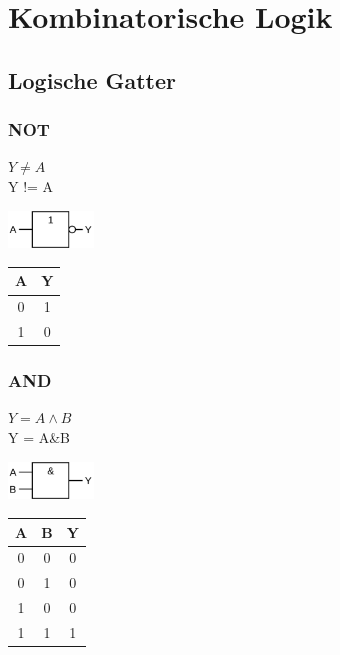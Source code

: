 \section{Kombinatorische Logik}

\subsection{Logische Gatter}

\subsubsection{NOT} 
\begin{center}
    \begin{minipage}{0.55\linewidth}
		$Y \neq A$ \\
		Y != A
        \begin{center}
		\includegraphics[height = 10mm]{images/not.png}		
        \end{center}
    \end{minipage}
    \hfill
    \begin{minipage}{0.35\linewidth}
        \begin{tabular}{|c|c|}
            \hline
            A & Y\\
            \hline
            0 & 1 \\
            1 & 0 \\
            \hline
        \end{tabular}
    \end{minipage}
\end{center}

\subsubsection{AND}
\begin{center}
	\begin{minipage}{0.55\linewidth}
		$Y = A \land B$ \\
		Y = A\&B
	\begin{center}
		\includegraphics[height = 10mm]{images/and.png}
	\end{center}
    \end{minipage}
    \hfill
    \begin{minipage}{0.35\linewidth}
        \begin{tabular}{|c c|c|}
            \hline
            A & B & Y\\
            \hline
            0 & 0 & 0\\
            0 & 1 & 0\\
            1 & 0 & 0\\
            1 & 1 & 1\\
            \hline
        \end{tabular}
    \end{minipage}
\end{center}

